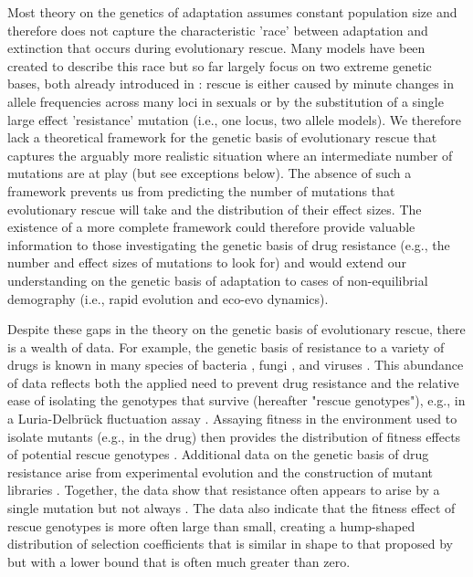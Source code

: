 \documentclass[9pt,twocolumn,twoside,lineno]{gsajnl}
\begin{document}
Most theory on the genetics of adaptation \citep[reviewed in][]{Orr2005} assumes constant population size and therefore does not capture the characteristic 'race' between adaptation and extinction that occurs during evolutionary rescue. 
Many models have been created to describe this race \citep[reviewed in][]{Alexander2014} but so far largely focus on two extreme genetic bases, both already introduced in \cite{Gomulkiewicz1995}: 
rescue is either caused by minute changes in allele frequencies across many loci in sexuals \citep[i.e., the infinitesimal model;][]{Fisher1918} or by the substitution of a single large effect 'resistance' mutation (i.e., one locus, two allele models).
We therefore lack a theoretical framework for the genetic basis of evolutionary rescue that captures the arguably more realistic situation where an intermediate number of mutations are at play (but see exceptions below). 
The absence of such a framework prevents us from predicting the number of mutations that evolutionary rescue will take and the distribution of their effect sizes.
The existence of a more complete framework could therefore provide valuable information to those investigating the genetic basis of drug resistance (e.g., the number and effect sizes of mutations to look for) and would extend our understanding on the genetic basis of adaptation to cases of non-equilibrial demography (i.e., rapid evolution and eco-evo dynamics).

Despite these gaps in the theory on the genetic basis of evolutionary rescue, there is a wealth of data.
For example, the genetic basis of resistance to a variety of drugs is known in many species of bacteria \citep[reviewed in][]{MacLean2010}, fungi \citep[reviewed in][]{Robbins2017}, and viruses \citep[reviewed in][]{Yilmaz2016}.
This abundance of data reflects both the applied need to prevent drug resistance and the relative ease of isolating the genotypes that survive (hereafter "rescue genotypes"), e.g., in a Luria-Delbr\"{u}ck fluctuation assay \citep[reviewed in][]{Bataillon2014}.
Assaying fitness in the environment used to isolate mutants (e.g., in the drug) then provides the distribution of fitness effects of potential rescue genotypes \citep[e.g.,][]{Kassen2006,MacLean2009}.
Additional data on the genetic basis of drug resistance arise from experimental evolution \citep[e.g.,][]{Gerstein2012,Foll2014} and the construction of mutant libraries \citep[e.g.,][]{Weinreich2006}.
Together, the data show that resistance often appears to arise by a single mutation \citep[e.g.,][]{MacLean2009,Lindsey2013,Gerstein2012} but not always \citep[e.g.,][]{Bataillon2011,Pennings2014,Gerstein2015}.
The data also indicate that the fitness effect of rescue genotypes is more often large than small, creating a hump-shaped distribution of selection coefficients \citep[e.g.,][]{Kassen2006,MacLean2009,Gerstein2012,Lindsey2013,Gerstein2015} that is similar in shape to that proposed by \cite{Kimura1983} but with a lower bound that is often much greater than zero.
\end{document}
